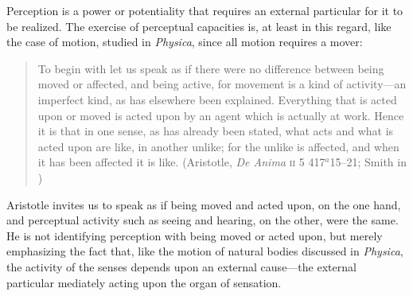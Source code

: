 Perception is a power or potentiality that requires an external particular for it to be realized. The exercise of perceptual capacities is, at least in this regard, like the case of motion, studied in \emph{Physica}, since all motion requires a mover:
\begin{quote}
	To begin with let us speak as if there were no difference between being moved or affected, and being active, for movement is a kind of activity---an imperfect kind, as has elsewhere been explained. Everything that is acted upon or moved is acted upon by an agent which is actually at work. Hence it is that in one sense, as has already been stated, what acts and what is acted upon are like, in another unlike; for the unlike is affected, and when it has been affected it is like. (Aristotle, \emph{De Anima} \textsc{ii} 5 417\( ^{a} \)15--21; Smith in \citealt[30]{Barnes:1984uq})
\end{quote}
Aristotle invites us to speak as if being moved and acted upon, on the one hand, and perceptual activity such as seeing and hearing, on the other, were the same. He is not identifying perception with being moved or acted upon, but merely emphasizing the fact that, like the motion of natural bodies discussed in \emph{Physica}, the activity of the senses depends upon an external cause---the external particular mediately acting upon the organ of sensation.

